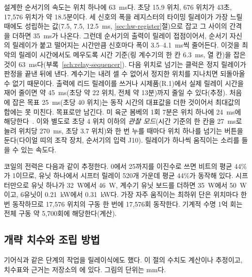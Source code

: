 설계한 순서기의 속도는 위치 하나에 63~ms다. 초당 15.9 위치, 676 위치가 43초, 17,576 위치가 약 18.5분이다.
세 신호의 폭을 레지스터의 타이밍 릴레이가 가장 느릴 때에도 성립하는 값(7.5, 7.5, 12.5~ms,
\ref{sec:hw-register}절)으로 잡고 그 사이의 간격을 더하면 35~ms가 나온다. 그런데 순서기의 출력이 릴레이
접점이어서, 순서기 자신의 릴레이가 붙고 떨어지는 시간만큼 신호마다 폭이 3.5--4.1~ms씩 줄어든다. 이것을 최악의
릴레이 시간에서도 메우도록 시간 기준(링 계수기의 한 칸 6.3~ms, 열 칸)을 잡은 것이 63~ms다(부록~\ref{sch:relay-sequencer}).
다음 위치로 넘기는 클럭은 정지 릴레이가 판정을 끝낸 뒤에 낸다. 계수기는 내려 셀 수 없어서 정지한 위치를 지나치면
되돌아올 수 없기 때문이다. 출력에 리드 릴레이를 쓰거나 시제품(R.1)에서 실제 릴레이 시간을 재어 줄이면 약 45~ms(초당
약 22 위치, 전체 약 13분)까지 줄일 수 있다(추정). 처음에 잡은 목표 25~ms(초당 40 위치)는 동작 시간의 대표값을
더한 것이어서 최대값의 합에는 못 미친다. 목표로만 남긴다.
미 육군 봄베의 1회 7분은 위치 하나에 24~ms에 해당한다~\cite{dturing2021army}.
이와 별도로 초당 4 위치 이하의 \emph{관찰 모드}(시간 기준의 한 칸을 27~ms로 늘려 위치당 270~ms, 초당 3.7 위치)와
한 번 누를 때마다 위치 하나를 넘기는 버튼을 둔다(다이얼 띠의 조작 장치, 순서기의 입력 J10). 릴레이가 하나씩 움직이는
소리를 들을 수 있는 속도다.

코일의 전력은 다음과 같이 추정한다. 0에서 25까지를 이진수로 쓰면 비트의 평균 44\%가 1이므로, 유닛 하나에서
시프터 릴레이 520개 가운데 평균 44\%가 동작해 있다. 시프터만으로 유닛 하나가 32~W에서 46~W, 계수기 유닛 보드를
더하면 35~W에서 50~W이고, 6유닛이 0.21~kW에서 0.31~kW다.
가장 자주 움직이는 최하위 단은 위치마다 한 번 동작하므로 17,576 위치의 구동 한 번에 17,576회 동작한다.
기계적 수명 1억 회는 전체 구동 약 5,700회에 해당한다(계산).

\subsection{개략 치수와 조립 방법}\label{sec:hw-relay-layout}

기어식과 같은 단계의 작업을 릴레이식에도 했다. 이 절의 수치도 계산이나 추정이고, 치수표와 근거는 저장소의
에 있다. 그림의 단위는 mm다.

